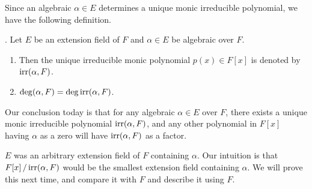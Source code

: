 Since an algebraic \(\alpha \in E\) determines a unique monic irreducible polynomial, we have the following definition.

. Let \(E\) be an extension field of \(F\) and \(\alpha \in E\) be algebraic over \(F\).
\begin{enumerate}
    \item Then the unique irreducible monic polynomial \(p(x) \in F[x]\) is denoted by \(\mathrm{irr}(\alpha, F)\).
    \item \(\deg (\alpha, F) = \deg \mathrm{irr}(\alpha, F)\).
\end{enumerate}

Our conclusion today is that for any algebraic \(\alpha \in E\) over \(F\), there exists a unique monic irreducible polynomial \(\mathrm{irr}(\alpha, F)\), and any other polynomial in \(F[x]\) having \(\alpha\) as a zero will have \(\mathrm{irr}(\alpha, F)\) as a factor.

\(E\) was an arbitrary extension field of \(F\) containing \(\alpha\). Our intuition is that \(F[x] \operatorname{/} \mathrm{irr}(\alpha, F)\) would be the smallest extension field containing \(\alpha\). We will prove this next time, and compare it with \(F\) and describe it using \(F\).

\pagebreak
